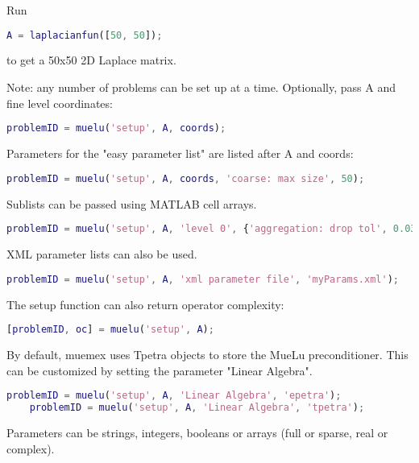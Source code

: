 Run

\begin{lstlisting}[language=Matlab]
    A = laplacianfun([50, 50]);
\end{lstlisting}

to get a 50x50 2D Laplace matrix.

Note: any number of problems can be set up at a time.
Optionally, pass A and fine level coordinates:

\begin{lstlisting}[language=Matlab]
    problemID = muelu('setup', A, coords);
\end{lstlisting}

Parameters for the "easy parameter list" are listed after A and coords:

\begin{lstlisting}[language=Matlab]
    problemID = muelu('setup', A, coords, 'coarse: max size', 50);
\end{lstlisting}

Sublists can be passed using MATLAB cell arrays.

\begin{lstlisting}[language=Matlab]
    problemID = muelu('setup', A, 'level 0', {'aggregation: drop tol', 0.03}, 'level 1', {'aggregation: drop tol', 0.01});
\end{lstlisting}

XML parameter lists can also be used.

\begin{lstlisting}[language=Matlab]
    problemID = muelu('setup', A, 'xml parameter file', 'myParams.xml');
\end{lstlisting}

The setup function can also return operator complexity:

\begin{lstlisting}[language=Matlab]
    [problemID, oc] = muelu('setup', A);
\end{lstlisting}

By default, muemex uses Tpetra objects to store the MueLu preconditioner.
This can be customized by setting the parameter "Linear Algebra".

\begin{lstlisting}[language=Matlab]
    problemID = muelu('setup', A, 'Linear Algebra', 'epetra');
    problemID = muelu('setup', A, 'Linear Algebra', 'tpetra');
\end{lstlisting}

Parameters can be strings, integers, booleans or arrays (full or sparse, real
or complex).

